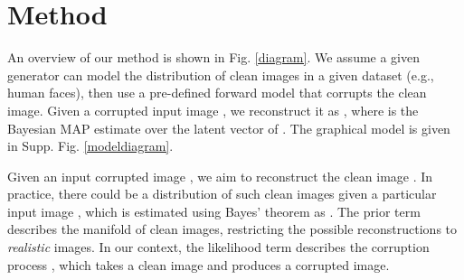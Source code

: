 \documentclass{article}
\newcommand{\fld}{results}
\begin{document}
\section{Method}



An overview of our method is shown in Fig. \ref{diagram}. We assume a given generator  can model the distribution of clean images in a given dataset (e.g., human faces), then use a pre-defined forward model  that corrupts the clean image. Given a corrupted input image , we reconstruct it as , where  is the Bayesian MAP estimate over the latent vector  of . The graphical model is given in Supp. Fig. \ref{modeldiagram}.




Given an input corrupted image , we aim to reconstruct the clean image . In practice, there could be a distribution  of such clean images given a particular input image , which is estimated using Bayes' theorem as . The prior term  describes the manifold of clean images, restricting the possible reconstructions  to \emph{realistic} images. In our context, the likelihood term  describes the corruption process , which takes a clean image and produces a corrupted image. 




\newcommand{\ei}[1]{\fld/00653-recon-real-imagesffhq_test-super-resolution-orig/image#1-target} \newcommand{\eo}[1]{\fld/00653-recon-real-imagesffhq_test-super-resolution-orig/image#1-clean-step5000.jpg} \newcommand{\en}[1]{\fld/00654-recon-real-imagesffhq_test-super-resolution-nonoise/image#1-clean-step5000.jpg} \newcommand{\ew}[1]{\fld/00655-recon-real-imagesffhq_test-super-resolution-wplus/image#1-clean-step5000.jpg} \newcommand{\el}[1]{\fld/00656-recon-real-imagesffhq_test-super-resolution-l2/image#1-clean-step5000.jpg} \newcommand{\ep}[1]{\fld/00657-recon-real-imagesffhq_test-super-resolution-priorw/image#1-clean-step5000.jpg} \newcommand{\ec}[1]{\fld/00658-recon-real-imagesffhq_test-super-resolution/image#1-clean-step5000.jpg} \newcommand{\eh}[1]{\fld/00653-recon-real-imagesffhq_test-super-resolution-orig/image#1-true.jpg} 


\newcommand{\eii}[1]{\fld/00700-recon-real-imagesffhq_test-inpaint-eval/image#1-target} \newcommand{\eio}[1]{\fld/00705-recon-real-imagesffhq_test-inpaint-eval-orig/image#1-clean-step5000.jpg} \newcommand{\ein}[1]{\fld/00704-recon-real-imagesffhq_test-inpaint-eval-nonoise/image#1-clean-step5000.jpg} \newcommand{\eiw}[1]{\fld/00703-recon-real-imagesffhq_test-inpaint-eval-wplus/image#1-clean-step5000.jpg} \newcommand{\eil}[1]{\fld/00702-recon-real-imagesffhq_test-inpaint-eval-l2/image#1-clean-step5000.jpg} \newcommand{\eip}[1]{\fld/00701-recon-real-imagesffhq_test-inpaint-eval-priorw/image#1-clean-step5000.jpg} \newcommand{\eic}[1]{\fld/00700-recon-real-imagesffhq_test-inpaint-eval/image#1-clean-step5000.jpg} \newcommand{\eih}[1]{\fld/00700-recon-real-imagesffhq_test-inpaint-eval/image#1-true.jpg} 
\end{document}
